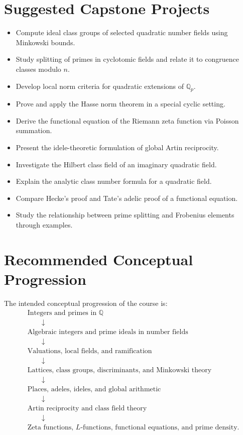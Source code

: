 \documentclass[11pt]{article}
\newcommand{\Q}{\mathbb{Q}}
\begin{document}
\section{Suggested Capstone Projects}

\begin{itemize}
    \item Compute ideal class groups of selected quadratic number fields using Minkowski bounds.
    \item Study splitting of primes in cyclotomic fields and relate it to congruence classes modulo $n$.
    \item Develop local norm criteria for quadratic extensions of $\Q_p$.
    \item Prove and apply the Hasse norm theorem in a special cyclic setting.
    \item Derive the functional equation of the Riemann zeta function via Poisson summation.
    \item Present the idele-theoretic formulation of global Artin reciprocity.
    \item Investigate the Hilbert class field of an imaginary quadratic field.
    \item Explain the analytic class number formula for a quadratic field.
    \item Compare Hecke's proof and Tate's adelic proof of a functional equation.
    \item Study the relationship between prime splitting and Frobenius elements through examples.
\end{itemize}

\section{Recommended Conceptual Progression}

The intended conceptual progression of the course is:
\[
\begin{aligned}
&\text{Integers and primes in }\Q \\
&\qquad\downarrow \\
&\text{Algebraic integers and prime ideals in number fields} \\
&\qquad\downarrow \\
&\text{Valuations, local fields, and ramification} \\
&\qquad\downarrow \\
&\text{Lattices, class groups, discriminants, and Minkowski theory} \\
&\qquad\downarrow \\
&\text{Places, adeles, ideles, and global arithmetic} \\
&\qquad\downarrow \\
&\text{Artin reciprocity and class field theory} \\
&\qquad\downarrow \\
&\text{Zeta functions, }L\text{-functions, functional equations, and prime density}.
\end{aligned}
\]
\end{document}
